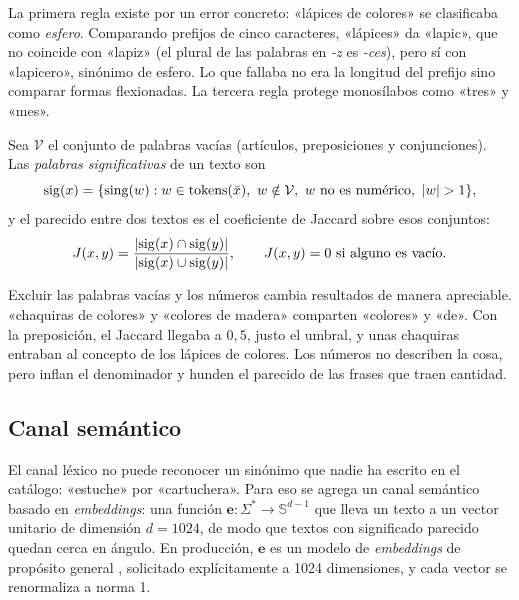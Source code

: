 La primera regla existe por un error concreto: «lápices de colores» se
clasificaba como \emph{esfero}. Comparando prefijos de cinco caracteres,
«lápices» da «lapic», que no coincide con «lapiz» (el plural de las palabras
en \emph{-z} es \emph{-ces}), pero sí con «lapicero», sinónimo de esfero. Lo
que fallaba no era la longitud del prefijo sino comparar formas flexionadas.
La tercera regla protege monosílabos como «tres» y «mes».

\begin{definicion}
\label{def:jaccard}
Sea $\mathcal{V}$ el conjunto de palabras vacías (artículos, preposiciones y
conjunciones). Las \emph{palabras significativas} de un texto son
\[
  \operatorname{sig}(x)=\{\operatorname{sing}(w) : w\in\mathrm{tokens}(\bar x),\ w\notin\mathcal{V},\
           w \text{ no es numérico},\ \left\lvert w \right\rvert>1\},
\]
y el parecido entre dos textos es el coeficiente de Jaccard
\cite{jaccard1912} sobre esos conjuntos:
\[
  J(x,y)=\frac{\left\lvert \operatorname{sig}(x)\cap\operatorname{sig}(y) \right\rvert}{\left\lvert \operatorname{sig}(x)\cup\operatorname{sig}(y) \right\rvert},
  \qquad J(x,y)=0 \text{ si alguno es vacío.}
\]
\end{definicion}

Excluir las palabras vacías y los números cambia resultados de manera
apreciable. «chaquiras de colores» y «colores de madera» comparten «colores»
y «de». Con la preposición, el Jaccard llegaba a $0{,}5$, justo el umbral, y
unas chaquiras entraban al concepto de los lápices de colores. Los números no
describen la cosa, pero inflan el denominador y hunden el parecido de las
frases que traen cantidad.

\subsection{Canal semántico}
\label{sec:res-semantico}

El canal léxico no puede reconocer un sinónimo que nadie ha escrito en el
catálogo: «estuche» por «cartuchera». Para eso se agrega un canal semántico
basado en \emph{embeddings}: una función $\mathbf{e}\colon\Sigma^*\to
\mathbb{S}^{d-1}$ que lleva un texto a un vector unitario de dimensión
$d=1024$, de modo que textos con significado parecido quedan cerca en ángulo.
En producción, $\mathbf{e}$ es un modelo de \emph{embeddings} de propósito
general \cite{lee2025gemini}, solicitado explícitamente a 1024 dimensiones,
y cada vector se renormaliza a norma 1.

